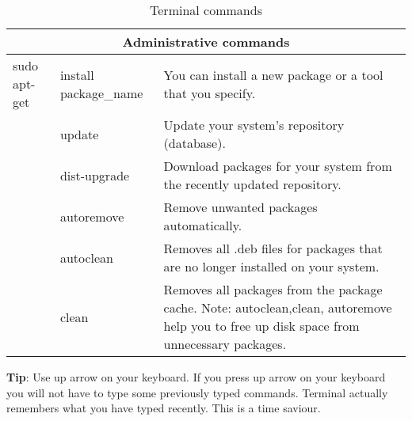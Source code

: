 \begin{table}[h]
\begin{tabular}{|l|l|p{11cm}|}
	\hline
	\multicolumn{3}{|c|}{\textbf{Administrative commands}} \\
 	\hline
 	sudo apt-get & install package\_name  & You can install a new package or a tool that you specify. \\
 	& update & Update your system's repository (database).  \\
 	& dist-upgrade & Download packages for your system from the recently updated repository. \\
 	& autoremove & Remove unwanted packages automatically.\\
 	& autoclean & Removes all .deb files for packages that are no longer installed on your system.\\
 	& clean & Removes all packages from the package cache. Note: autoclean,clean, autoremove help you to free up disk space from unnecessary packages.\\
   \hline
	
	\hline
	\end{tabular}
	\label{tab:terminal-commands}
	\caption{Terminal commands }
\end{table}

\par \noindent \textbf{Tip}: Use up arrow  on your keyboard. If you press up arrow on your keyboard you will not have to type some previously typed commands. Terminal actually remembers what you have typed recently. This is a time saviour. 